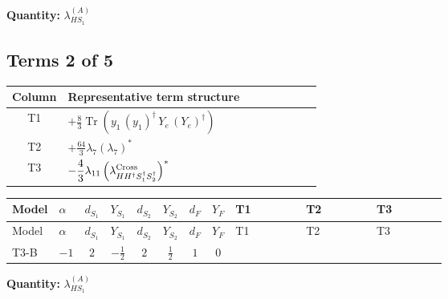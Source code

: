 \documentclass[8pt]{article}
\begin{document}
\begin{landscape}
\begin{longtable}{@{}llcccccc >{\raggedright\arraybackslash}p{0.21\linewidth} >{\raggedright\arraybackslash}p{0.21\linewidth} >{\raggedright\arraybackslash}p{0.21\linewidth}@{}}
\midrule
\bottomrule
\end{longtable}
\clearpage
\noindent\textbf{Quantity: }$\lambda_{HS_1}^{(A)}$\par\smallskip
\subsection*{Terms 2 of 5}
\begin{center}
\begin{tabular}{@{}c >{\raggedright\arraybackslash}p{0.82\linewidth}@{}}
\toprule
Column & Representative term structure \\
\midrule
T1 & \(\displaystyle +\frac{8}{3} \operatorname{Tr}\!\left({y_1}\,\left({y_1}\right)^{\dagger}\,{Y_e}\,\left({Y_e}\right)^{\dagger}\right)\) \\
\midrule
T2 & \(\displaystyle +\frac{64}{3} {\lambda_{7}} \left({\lambda_{7}}\right)^{*}\) \\
\midrule
T3 & \(\displaystyle -\frac{4}{3} {\lambda_{11}} \left({\lambda_{H H^\dagger S_1^\dagger S_2^\dagger}^{\rm Cross}}\right)^{*}\) \\
\midrule
\bottomrule
\end{tabular}
\end{center}
\smallskip
\tiny
\begin{longtable}{@{}llcccccc >{\raggedright\arraybackslash}p{0.21\linewidth} >{\raggedright\arraybackslash}p{0.21\linewidth} >{\raggedright\arraybackslash}p{0.21\linewidth}@{}}
\toprule
Model & $\alpha$ & $d_{S_1}$ & $Y_{S_1}$ & $d_{S_2}$ & $Y_{S_2}$ & $d_F$ & $Y_F$ & T1 & T2 & T3 \\
\midrule
\endfirsthead
\toprule
Model & $\alpha$ & $d_{S_1}$ & $Y_{S_1}$ & $d_{S_2}$ & $Y_{S_2}$ & $d_F$ & $Y_F$ & T1 & T2 & T3 \\
\midrule
\endhead
T3-B & $-1$ & $2$ & $-\frac{1}{2}$ & $2$ & $\frac{1}{2}$ & $1$ & $0$ & \scriptsize\adjustbox{max width=\linewidth}{$\begin{gathered} +\frac{8}{3} \operatorname{Tr}\!\left({y_1}\,\left({y_1}\right)^{\dagger}\,{Y_e}\,\left({Y_e}\right)^{\dagger}\right)\end{gathered}$} & \scriptsize\adjustbox{max width=\linewidth}{$\begin{gathered} +\frac{64}{3} {\lambda_{7}} \left({\lambda_{7}}\right)^{*}\end{gathered}$} & \scriptsize\adjustbox{max width=\linewidth}{$\begin{gathered} -\frac{4}{3} {\lambda_{11}} \left({\lambda_{H H^\dagger S_1^\dagger S_2^\dagger}^{\rm Cross}}\right)^{*}\end{gathered}$} \\
\midrule
\bottomrule
\end{longtable}
\clearpage
\noindent\textbf{Quantity: }$\lambda_{HS_1}^{(A)}$\par\smallskip

\end{landscape}
\end{document}
